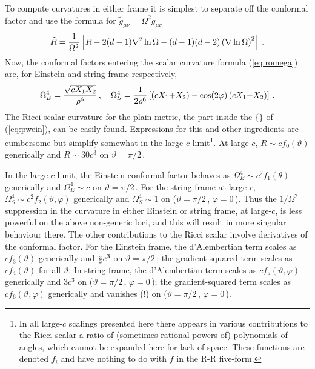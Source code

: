 \documentclass[a4paper,12pt]{amsproc}
\numberwithin{equation}{section}
\def\thalf{\mbox{\scriptsize{${{3}\over{2}}$}}}
\def\vtpt{$\vartheta=\pi/2$\,}
\def\vpz{$\varphi=0$\,}
\begin{document}
To compute curvatures in either frame it is simplest to separate off
the conformal factor and use the formula for
${\tilde{g}}_{\mu\nu}=\Omega^2 g_{\mu\nu}$
%
\begin{equation}\label{eq:romega}
{\tilde{R}}={{1}\over{\Omega^2}}\left[R-2(d-1)\nabla^2 \ln\Omega
- (d-1)(d-2)\left(\nabla \ln\Omega\right)^2 \right] \,.
\end{equation}
%
Now, the conformal factors entering the scalar curvature formula
(\ref{eq:romega}) are, for Einstein and string frame respectively,
%
\begin{equation}
\Omega_E^4 = {{\sqrt{cX_1X_2}}\over{\rho^6}} \,,\quad 
\Omega_S^4 = {{1}\over{2\rho^6}} \left[ \left(cX_1{+}X_2\right)
-\cos(2\varphi)\left(cX_1{-}X_2\right) \right] \,.
\end{equation}
%
The Ricci scalar curvature for the plain metric, the part inside the
$\{ \}$ of (\ref{eq:pwein}), can be easily found.  Expressions for
this and other ingredients are cumbersome but simplify somewhat in the
large-$c$ limit\footnote{In all large-$c$ scalings presented here
there appears in various contributions to the Ricci scalar a ratio of
(sometimes rational powers of) polynomials of angles, which cannot be
expanded here for lack of space.  These functions are denoted $f_i$
and have nothing to do with $f$ in the R-R five-form.}.  At large-$c$,
%
$R\sim c f_0(\vartheta)$ generically and $R\sim 30c^3$ on \vtpt.

In the large-$c$ limit, the Einstein conformal factor behaves as
%
$\Omega_E^4\sim c^2 f_1(\theta)$ generically and $\Omega_E^4\sim c$ on
\vtpt.
%
For the string frame at large-$c$, 
%
$\Omega_S^4\sim c^2 f_2(\vartheta,\varphi)$ generically and
$\Omega_S^4\sim 1$ on (\vtpt, \vpz).
%
Thus the $1/\Omega^2$ suppression in the curvature in either Einstein
or string frame, at large-$c$, is less powerful on the above
non-generic loci, and this will result in more singular behaviour
there.
%
The other contributions to the Ricci scalar involve derivatives of the
conformal factor.  For the Einstein frame, the d'Alembertian term
scales as
%
$c f_3(\vartheta)$ generically and $\thalf c^3$ on \vtpt;
%
the gradient-squared term scales as 
%
$c f_4(\vartheta)$ for all $\vartheta$.  
%
In string frame, the d'Alembertian term scales as
%
$c f_5(\vartheta,\varphi)$ generically and 
$3 c^3$ on (\vtpt, \vpz);
%
the gradient-squared term scales as 
%
$c f_6(\vartheta,\varphi)$ generically and vanishes (!) on (\vtpt,
\vpz).
\end{document}
